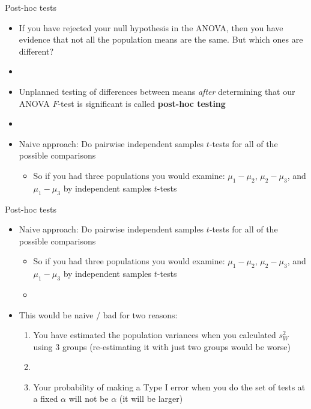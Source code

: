 \documentclass[xcolor=dvipsnames]{beamer}
\begin{document}
\begin{frame}{Post-hoc tests}
	\begin{itemize}
		\item If you have rejected your null hypothesis in the ANOVA, then you have evidence that not all the population means are the same. But which ones are different? \pause
		\item[]
		\item Unplanned testing of differences between means \emph{after} determining that our ANOVA $F$-test is significant is called \textbf{post-hoc testing} \pause
		\item[]
		\item Naive approach: Do pairwise independent samples $t$-tests for all of the possible comparisons \pause
		\begin{itemize}
			\item So if you had three populations you would examine: $\mu_1-\mu_2$, $\mu_2-\mu_3$, and $\mu_1-\mu_3$ by independent samples $t$-tests
		\end{itemize}
	\end{itemize}
\end{frame}

\begin{frame}{Post-hoc tests}
	\begin{itemize}
		\item Naive approach: Do pairwise independent samples $t$-tests for all of the possible comparisons \pause
		\begin{itemize}
			\item So if you had three populations you would examine: $\mu_1-\mu_2$, $\mu_2-\mu_3$, and $\mu_1-\mu_3$ by independent samples $t$-tests \pause
			\item[]
		\end{itemize}
		\item This would be naive / bad for two reasons: \pause
		\begin{enumerate}
			\item You have estimated the population variances when you calculated $s^2_W$ using 3 groups (re-estimating it with just two groups would be worse) \pause
			\item[]
			\item Your probability of making a Type I error when you do the set of tests at a fixed $\alpha$ will not be $\alpha$ (it will be larger)
		\end{enumerate}
	\end{itemize}
\end{frame}
\end{document}
